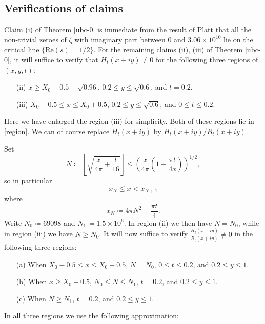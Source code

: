 \subsection{Verifications of claims}

Claim (i) of Theorem \ref{ubc-0} is immediate from the result of Platt \cite{platt} that all the non-trivial zeroes of $\zeta$ with imaginary part between $0$ and $3.06 \times 10^{10}$ lie on the critical line $\{ \mathrm{Re}(s) = 1/2\}$.  For the remaining claims (ii), (iii) of Theorem \ref{ubc-0}, it will suffice to verify that $H_t(x+iy) \neq 0$ for the following three regions of $(x,y,t)$:
\begin{itemize}
\item[(ii)]  $x \geq X_0 - 0.5 + \sqrt{0.96}$, $0.2 \leq y \leq \sqrt{0.6}$, and $t = 0.2$. 
\item[(iii)]  $X_0 - 0.5 \leq x \leq X_0 + 0.5$, $0.2 \leq y \leq \sqrt{0.6}$, and $0 \leq t \leq 0.2$.
\end{itemize}
Here we have enlarged the region (iii) for simplicity.  Both of these regions lie in \eqref{region}.  We can of course replace $H_t(x+iy)$ by $H_t(x+iy)/B_t(x+iy)$.  

Set
$$ N \coloneqq \left\lfloor \sqrt{\frac{x}{4\pi} + \frac{t}{16}} \right\rfloor \leq \left(\frac{x}{4\pi} (1 + \frac{\pi t}{4x})\right)^{1/2},$$
so in particular
\begin{equation}\label{xnn}
 x_N \leq x < x_{N+1}
\end{equation}
where
$$ x_N \coloneqq 4 \pi N^2 - \frac{\pi t}{4}.$$
Write $N_0 \coloneqq 69098$ and $N_1 \coloneqq 1.5 \times 10^6$.
In region (ii) we then have $N = N_0$, while in region (iii) we have $N \geq N_0$.  It will now suffice to verify $\frac{H_t(x+iy)}{B_t(x+iy)} \neq 0$ in the following three regions:
\begin{itemize}
\item[(a)]  When $X_0 - 0.5 \leq x \leq X_0 + 0.5$, $N = N_0$, $0 \leq t \leq 0.2$, and $0.2 \leq y \leq 1$.
\item[(b)]  When $x \geq X_0 - 0.5$, $N_0 \leq N \leq N_1$, $t = 0.2$, and $0.2 \leq y \leq 1$.
\item[(c)]  When $N \geq N_1$, $t = 0.2$, and $0.2 \leq y \leq 1$.
\end{itemize}

In all three regions we use the following approximation:

